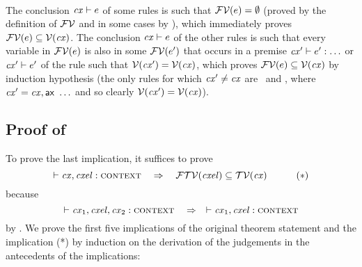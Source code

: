 \begin{bycase}
\Case{\restrules}\\
The conclusion $\mathit{cx}\vdash e$ of some rules is such that
$\mathcal{FV}(e)=\emptyset$ (proved by the definition of $\mathcal{FV}$ and in some
cases by ), which immediately proves
$\mathcal{FV}(e)\subseteq\mathcal{V}(\mathit{cx})$. The conclusion $\mathit{cx}\vdash e$ of the
other rules is such that every variable in $\mathcal{FV}(e)$ is also in some
$\mathcal{FV}(e')$ that occurs in a premise $\mathit{cx}'\vdash e':\ldots$ or
$\mathit{cx}'\vdash e'$ of the rule such that $\mathcal{V}(\mathit{cx}')=\mathcal{V}(\mathit{cx})$, which
proves $\mathcal{FV}(e)\subseteq\mathcal{V}(\mathit{cx})$ by induction hypothesis (the only rules
for which $\mathit{cx}'\neq\mathit{cx}$ are \Rthifsbs\ and \Rthif, where
$\mathit{cx}'=\mathit{cx},\mathsf{ax}\ \ldots$ and so clearly $\mathcal{V}(\mathit{cx}')=\mathcal{V}(\mathit{cx})$).

\end{bycase}



\subsection*{Proof of }

To prove the last implication, it suffices to prove
\[
\cxwf{\snoc{\cx}{\cxel}}\ \ \IMPLIES\ \ \ftvar{\cxel}\subseteq\cxtvarO
\hspace{3em}(*)
\]
because
\[
\cxwf{\cx_1,\cxel,\cx_2}\ \ \IMPLIES\ \ \cxwf{\snoc{\cx_1}{\cxel}}
\]
by . We prove the first five implications of the original
theorem statement and the implication (*) by induction on the derivation of
the judgements in the antecedents of the implications:

